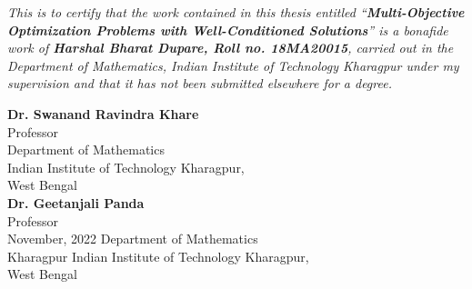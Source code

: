 % 
%  
\begin{Certificate}

\textit{This is to certify that the work contained in this thesis entitled ``\textbf{Multi-Objective Optimization Problems with Well-Conditioned Solutions}'' is a bonafide work of \textbf{Harshal Bharat Dupare, Roll no. 18MA20015}, carried out in the Department of Mathematics, Indian Institute of Technology Kharagpur under my supervision and that it has not been submitted elsewhere for a degree.}\\
\vspace*{1in}
\begin{flushright}
\textbf{Dr. Swanand Ravindra Khare}\\
Professor\\
\hfill Department of Mathematics\\
\hfill Indian Institute of Technology Kharagpur,\\
West Bengal\\
\vspace*{1in}
\textbf{Dr. Geetanjali Panda}\\
Professor\\
November, 2022 \hfill Department of Mathematics\\
Kharagpur \hfill Indian Institute of Technology Kharagpur,\\
West Bengal
\end{flushright}
\end{Certificate}

